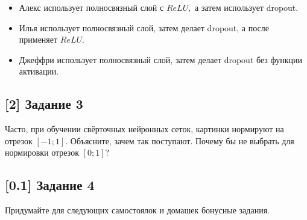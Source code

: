 \documentclass[12pt, a4paper, oneside]{article}
\begin{document}
\begin{itemize} 
\item Алекс использует полносвязный слой с $ReLU,$ а затем использует dropout. 
\item Илья использует полносвязный слой, затем делает dropout, а после применяет $ReLU.$
\item Джеффри использует полносвязный слой, затем делает dropout без функции активации. 
\end{itemize} 

\vspace{-0.5cm}
\subsection*{[2] Задание 3}
\vspace{-0.5cm}

Часто, при обучении свёрточных нейронных сеток, картинки нормируют на отрезок $[-1; 1].$ Объясните, зачем так поступают. Почему бы не выбрать для нормировки отрезок $[0; 1]?$


\vspace{-0.5cm}
\subsection*{[0.1] Задание 4}
\vspace{-0.5cm}

Придумайте для следующих самостоялок и домашек бонусные задания.
\end{document}

